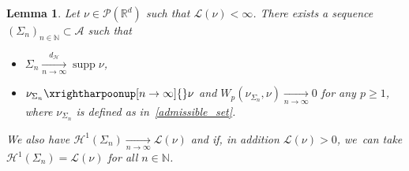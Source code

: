 \documentclass[JEP,XML,SOM,Unicode,NoFloatCountersInSection,published]{cedram}
\newtheorem{lemma}[theorem]{Lemma}
\theoremstyle{definition}
\newcommand\cH{\mathcal{H}}
\newcommand{\RR}{\mathbb{R}}
\DeclareMathOperator{\supp}{supp}
\newcommand{\distH}{d_{\mathcal{H}}}
\begin{document}
\begin{lemma}
\label{lemma.approximation_lemma}
Let $\nu \!\in\! \mathcal{P}(\RR^d)$ such that $\mathcal{L}(\nu) \!<\! \infty$. There exists a sequence $\left(\Sigma_n\right)_{n \in \mathbb{N}} \!\subset\! \mathcal{A}$ such that
\begin{itemize}
\item $\Sigma_n \xrightarrow[n \to \infty]{\distH} \supp \nu$,
\item $\nu_{\Sigma_n} \xrightharpoonup[n \to \infty]{} \nu$ and $W_p(\nu_{\Sigma_n}, \nu) \xrightarrow[n \to \infty]{} 0$ for any $p \ge 1$, where $\nu_{\Sigma_n}$ is defined as in~\eqref{admissible_set}.
\end{itemize}
We also have $\cH^1(\Sigma_n) \xrightarrow[n \to \infty]{} \mathcal{L}(\nu)$ and if, in addition $\mathcal{L}(\nu) > 0$, we~can take $\cH^1(\Sigma_n) = \mathcal{L}(\nu)$ for all $n \in \mathbb{N}$.
\end{lemma}
\end{document}

